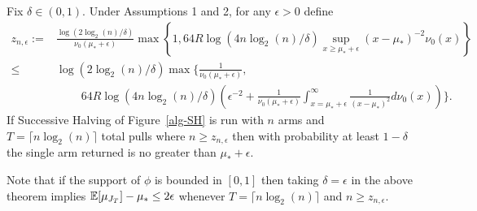 \begin{theorem}\label{thm:main}
Fix $\delta \in (0,1)$. Under Assumptions 1 and 2, for any $\epsilon >0$ define
\begin{align*}
z_{n,\epsilon} :=& \frac{\log(2 \log_2(n)/\delta)}{  \nu_0(\mu_* + \epsilon)} \max\left\{ 1, 64 R \log(4 n \log_2(n) /\delta) \sup_{x \geq \mu_* + \epsilon}  (x-\mu_*)^{-2}  \nu_0(x) \right\}\\
\leq& \log(2 \log_2(n)/\delta) \max\Bigg\{ \frac{1}{\nu_0(\mu_* + \epsilon)},
\\ &~~~~~~~~~~
64 R \log(4 n \log_2(n) /\delta) \left( \epsilon^{-2} + \frac{1}{\nu_0(\mu_* + \epsilon)}\int_{x = \mu_* + \epsilon}^\infty  \frac{1}{(x-\mu_*)^{2}}  d\nu_0(x) \right) \Bigg\}.
\end{align*}
If Successive Halving of Figure~\ref{alg-SH} is run with $n$ arms and $T=\lceil n \log_2(n) \rceil$ total pulls where $n \geq z_{n,\epsilon}$ then with probability at least $1-\delta$ the single arm returned is no greater than $\mu_* +\epsilon$.
\end{theorem}

\begin{remark}
Note that if the support of $\phi$ is bounded in $[0,1]$ then taking $\delta=\epsilon$ in the above theorem implies $\mathbb{E}[ \mu_{J_{T}} ] - \mu_*\leq 2 \epsilon$ whenever $T=\lceil n \log_2(n) \rceil$ and $n \geq z_{n,\epsilon}$.
\end{remark}


